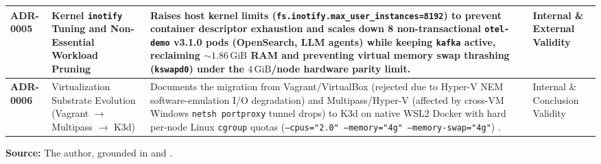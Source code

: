 \begin{table}[htbp]
\begin{tabularx}{\textwidth}{|l|p{3.2cm}|X|p{2.6cm}|}
\textbf{ADR-0005} & Kernel \texttt{inotify} Tuning and Non-Essential Workload Pruning & Raises host kernel limits (\texttt{fs.inotify.max\_user\_instances=8192}) to prevent container descriptor exhaustion \cite{bernstein_2014} and scales down 8 non-transactional \texttt{otel-demo} v3.1.0 pods (OpenSearch, LLM agents) while keeping \texttt{kafka} active, reclaiming $\sim 1.86\,\text{GiB}$ RAM and preventing virtual memory swap thrashing (\texttt{kswapd0}) \cite{denning_1968, kuria_2024} under the $4\,\text{GiB}$/node hardware parity limit. & Internal \& External Validity \cite{denning_1968, kuria_2024} \\ \hline
\textbf{ADR-0006} & Virtualization Substrate Evolution (Vagrant $\rightarrow$ Multipass $\rightarrow$ K3d) & Documents the migration from Vagrant/VirtualBox (rejected due to Hyper-V NEM software-emulation I/O degradation) and Multipass/Hyper-V (affected by cross-VM Windows \texttt{netsh portproxy} tunnel drops) to K3d on native WSL2 Docker with hard per-node Linux \texttt{cgroup} quotas (\texttt{--cpus="2.0" --memory="4g" --memory-swap="4g"}) \cite{bernstein_2014, jain_1991}. & Internal \& Conclusion Validity \cite{bernstein_2014, jain_1991} \\ \hline
\end{tabularx}
\par\medskip\ABNTEXfontereduzida\selectfont\textbf{Source:} The author, grounded in  and . \par\medskip
\end{table}